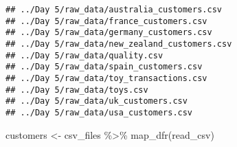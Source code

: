 \documentclass[
]{article}
\newenvironment{Shaded}{\begin{snugshade}}{\end{snugshade}}
\newcommand{\AttributeTok}[1]{\textcolor[rgb]{0.77,0.63,0.00}{#1}}
\newcommand{\FunctionTok}[1]{\textcolor[rgb]{0.00,0.00,0.00}{#1}}
\newcommand{\NormalTok}[1]{#1}
\newcommand{\OtherTok}[1]{\textcolor[rgb]{0.56,0.35,0.01}{#1}}
\newcommand{\SpecialCharTok}[1]{\textcolor[rgb]{0.00,0.00,0.00}{#1}}
\newcommand{\StringTok}[1]{\textcolor[rgb]{0.31,0.60,0.02}{#1}}
\begin{document}
\begin{verbatim}
## ../Day 5/raw_data/australia_customers.csv
## ../Day 5/raw_data/france_customers.csv
## ../Day 5/raw_data/germany_customers.csv
## ../Day 5/raw_data/new_zealand_customers.csv
## ../Day 5/raw_data/quality.csv
## ../Day 5/raw_data/spain_customers.csv
## ../Day 5/raw_data/toy_transactions.csv
## ../Day 5/raw_data/toys.csv
## ../Day 5/raw_data/uk_customers.csv
## ../Day 5/raw_data/usa_customers.csv
\end{verbatim}

\begin{Shaded}
\end{Shaded}

\begin{Shaded}
\begin{Highlighting}[]
\NormalTok{customers }\OtherTok{\textless{}{-}}\NormalTok{ csv\_files }\SpecialCharTok{\%\textgreater{}\%} 
  \FunctionTok{map\_dfr}\NormalTok{(read\_csv)}
\end{Highlighting}
\end{Shaded}
\end{document}
